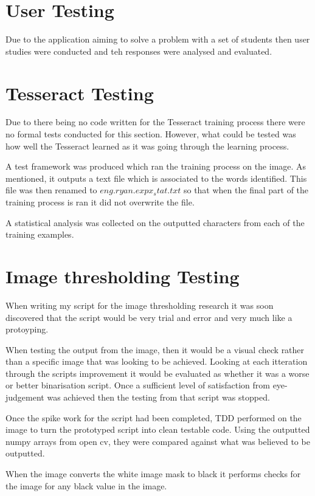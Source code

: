 \section{User Testing}

Due to the application aiming to solve a problem with a set of students then user studies were conducted and teh responses were analysed and evaluated.

\section{Tesseract Testing}
Due to there being no code written for the Tesseract training process there were no formal tests conducted for this section. However, what could be tested was how well the Tesseract learned as it was going through the learning process.

A test framework was produced which ran the training process on the image. As mentioned, it outputs a text file which is associated to the words identified. This file was then renamed to $eng.ryan.expx_stat.txt$ so that when the final part of the training process is ran it did not overwrite the file.

A statistical analysis was collected on the outputted characters from each of the training examples.


\section{Image thresholding Testing}
When writing my script for the image thresholding research it was soon discovered that the script would be very trial and error and very much like a protoyping.

When testing the output from the image, then it would be a visual check rather than a specific image that was looking to be achieved. Looking at each itteration through the scripts improvement it would be evaluated as whether it was a worse or better binarisation script. Once a sufficient level of satisfaction from eye-judgement was achieved then the testing from that script was stopped.

Once the spike work for the script had been completed, TDD performed on the image to turn the prototyped script into clean testable code. Using the outputted numpy arrays from open cv, they were compared against what was believed to be outputted.

When the image converts the white image mask to black it performs checks for the image for any black value in the image.
